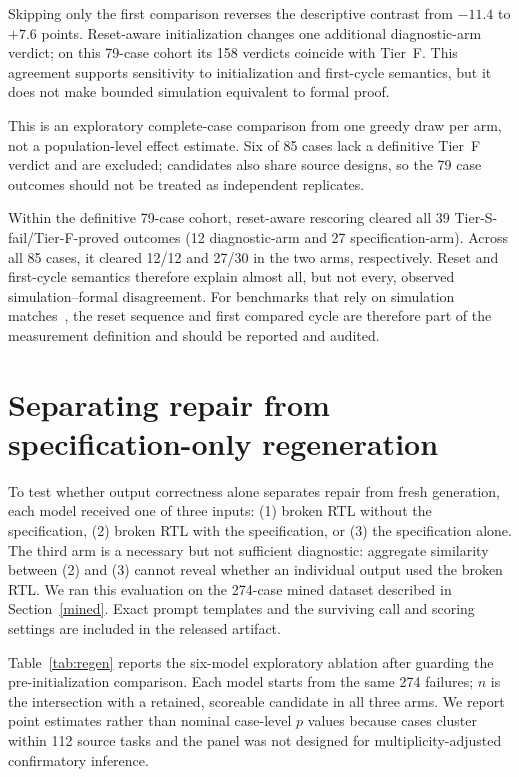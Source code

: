 \documentclass{article}
\begin{document}
Skipping only the first comparison reverses the descriptive contrast from $-11.4$ to $+7.6$ points.
Reset-aware initialization changes one additional diagnostic-arm verdict; on this 79-case cohort its
158 verdicts coincide with Tier~F. This agreement supports sensitivity to initialization and
first-cycle semantics, but it does not make bounded simulation equivalent to formal proof.

This is an exploratory complete-case comparison from one greedy draw per arm, not a population-level
effect estimate. Six of 85 cases lack a definitive Tier~F verdict and are excluded; candidates also
share source designs, so the 79 case outcomes should not be treated as independent replicates.

Within the definitive 79-case cohort, reset-aware rescoring cleared all 39 Tier-S-fail/Tier-F-proved
outcomes (12 diagnostic-arm and 27 specification-arm). Across all 85 cases, it cleared 12/12 and
27/30 in the two arms, respectively. Reset and first-cycle semantics
therefore explain almost all, but not every, observed simulation--formal disagreement. For benchmarks
that rely on simulation matches~\cite{verilogeval,rtllm,autochip},
the reset sequence and first compared cycle are therefore part of the measurement definition and
should be reported and audited.

\section{Separating repair from specification-only regeneration}\label{section5}

To test whether output correctness alone separates repair from fresh generation, each model received
one of three inputs: (1) broken RTL without the specification, (2) broken RTL with the specification,
or (3) the specification alone. The third arm is a necessary but not sufficient diagnostic: aggregate
similarity between (2) and (3) cannot reveal whether an individual output used the broken RTL. We ran
this evaluation on the 274-case mined dataset described in Section~\ref{mined}. Exact prompt templates
and the surviving call and scoring settings are included in the released artifact.

Table~\ref{tab:regen} reports the six-model exploratory ablation after guarding the
pre-initialization comparison. Each model starts from the same 274 failures; $n$ is the intersection
with a retained, scoreable candidate in all three arms. We report point estimates rather than nominal
case-level $p$ values because cases cluster within 112 source tasks and the panel was not designed for
multiplicity-adjusted confirmatory inference.
\end{document}
